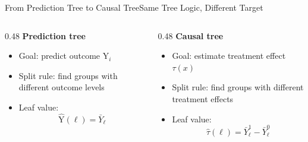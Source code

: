 \documentclass[hyperref={pdfpagelabels=false}]{beamer}
\begin{document}
\begin{frame}{From Prediction Tree to Causal Tree}{Same Tree Logic, Different Target}

\begin{columns}[T]
\begin{column}{0.48\textwidth}
\textbf{Prediction tree}
\vspace{0.1cm}
\begin{itemize}
  \item Goal: predict outcome $\mathrm{Y}_i$
  \vspace{0.1cm}
  \item Split rule: find groups with different outcome levels
  \vspace{0.1cm}
  \item Leaf value:
  \[
    \hat{\mathrm{Y}}(\ell)=\bar{Y}_{\ell}
  \]
\end{itemize}
\end{column}

\begin{column}{0.48\textwidth}
\textbf{Causal tree}
\vspace{0.1cm}
\begin{itemize}
  \item Goal: estimate treatment effect $\tau(x)$
  \vspace{0.1cm}
  \item Split rule: find groups with different treatment effects
  \vspace{0.1cm}
  \item Leaf value:
  \[
    \hat{\tau}(\ell)=\bar{Y}^{1}_{\ell}-\bar{Y}^{0}_{\ell}
  \]
\end{itemize}
\end{column}
\end{columns}

\vspace{0.25cm}
\begin{center}
\end{center}

\end{frame}
\end{document}
